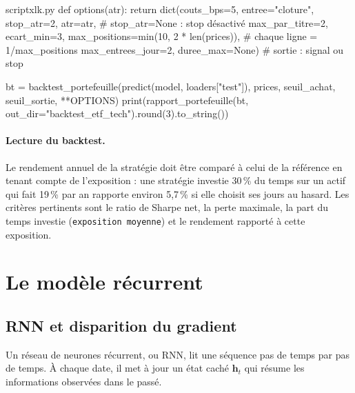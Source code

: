 \documentclass[11pt,a4paper]{article}
\renewcommand{\_}{\usorig\allowbreak}   %
\newcommand{\f}[1]{\texttt{#1}}        %
\begin{document}
\begin{code}{script\_xlk.py}
def options(atr):
    return dict(couts_bps=5, entree="cloture",
                stop_atr=2, atr=atr,                     # stop_atr=None : stop désactivé
                max_par_titre=2, ecart_min=3,
                max_positions=min(10, 2 * len(prices)),  # chaque ligne = 1/max_positions
                max_entrees_jour=2,
                duree_max=None)                          # sortie : signal ou stop

bt = backtest_portefeuille(predict(model, loaders["test"]), prices,
                           seuil_achat, seuil_sortie, **OPTIONS)
print(rapport_portefeuille(bt, out_dir="backtest_etf_tech").round(3).to_string())
\end{code}

\paragraph{Lecture du backtest.} Le rendement annuel de la stratégie doit être comparé à
celui de la référence en tenant compte de l'exposition : une stratégie investie 30\,\% du
temps sur un actif qui fait 19\,\% par an rapporte environ 5,7\,\% si elle choisit ses jours
au hasard. Les critères pertinents sont le ratio de Sharpe net, la perte maximale, la
part du temps investie (\f{exposition moyenne}) et le rendement rapporté à cette
exposition.

\section{Le modèle récurrent}\label{sec:lstm}
\subsection{RNN et disparition du gradient}
Un réseau de neurones récurrent, ou RNN, lit une séquence pas de temps par pas de temps.
À chaque date, il met à jour un état caché $\bm h_t$ qui résume les informations
observées dans le passé.
\end{document}
